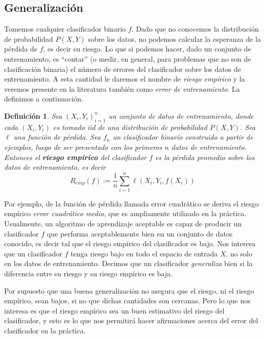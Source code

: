\documentclass{report}
\newtheorem{dfn}{Definición}[subsection]
\begin{document}
\subsection{Generalización}

Tomemos cualquier clasificador binario $f$. Dado que no conocemos la distribución de probabilidad $P(X,Y)$ sobre los datos, no podemos calcular 
la esperanza de la pérdida de $f$, es decir su riesgo. Lo que si podemos hacer, dado un conjunto de entrenamiento, es ``contar'' (o medir, en general, para problemas
que no son de clasificación binaria) el número de errores del clasificador sobre los datos de entrenamiento. A esta cantidad le daremos
el nombre de \textit{riesgo empírico} y la veremos presente en la literatura también como \textit{error de entrenamiento}. La definimos a continuación.\newline

\begin{dfn} \label{dfn:riesgo_empirico}
    Sea $(X_i,Y_i)_{i=1}^n$ un conjunto de datos de entrenamiento, donde cada $(X_i,Y_i)$ es tomado iid de una distribución de probabilidad $P(X,Y)$. Sea
    $\ell$ una función de pérdida. Sea $f_n$ un clasificador binario construido a partir de ejemplos, luego
    de ser presentado con los primeros $n$ datos de entrenamiento.
    Entonces el \textbf{riesgo empírico} del clasificador $f$ es la pérdida promedio sobre los datos de entrenamiento, es decir
    \[
    R_{emp}(f) := \frac{1}{n} \sum_{i=1}^n \ell(X_i,Y_i,f(X_i))
    \]
\end{dfn}

Por ejemplo, de la función de pérdida llamada error cuadrático se deriva el riesgo empírico \textit{error cuadrático medio}, que es ampliamente
utilizado en la práctica. Usualmente, un algoritmo de aprendizaje aceptable es capaz de producir un clasificador $f$ que performa aceptablemente bien en un conjunto de datos
conocido, es decir tal que el riesgo empírico del clasificador es bajo. Nos interesa que un clasificador $f$ tenga riesgo bajo en todo el espacio
de entrada $X$, no solo en los datos de entrenamiento. Decimos que un clasificador \textit{generaliza} bien si la diferencia entre su riesgo
y su riesgo empírico es baja.\newline

Por supuesto que una buena generalización no asegura que el riesgo, ni el riesgo empírico, sean bajos, si no que dichas cantidades son cercanas.
Pero lo que nos interesa es que el riesgo empírico sea un buen estimativo del riesgo del clasificador, y esto es lo que nos permitirá
hacer afirmaciones acerca del error del clasificador en la práctica.
\end{document}
